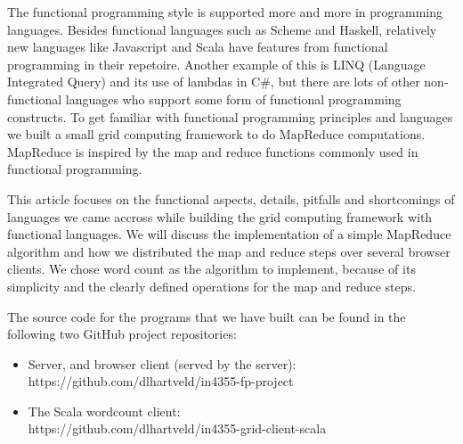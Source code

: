 The functional programming style is supported more and more in programming
languages. Besides functional languages such as Scheme and Haskell, relatively
new languages like Javascript and Scala have features from functional
programming in their repetoire. Another example of this is LINQ (Language
Integrated Query) and its use of lambdas in C\#, but there are lots of other
non-functional languages who support some form of functional programming
constructs. To get familiar with functional programming principles and languages
we built a small grid computing framework to do MapReduce computations.
MapReduce is inspired by the map and reduce functions commonly used in
functional programming.

This article focuses on the functional aspects, details, pitfalls and
shortcomings of languages we came accross while building the grid computing
framework with functional languages. We will discuss the implementation of a
simple MapReduce algorithm and how we distributed the map and reduce steps over
several browser clients. We chose word count as the algorithm to implement,
because of its simplicity and the clearly defined operations for the map and
reduce steps.

The source code for the programs that we have built can be found in the following
two GitHub project repositories:
\begin{itemize}
  \item Server, and browser client (served by the server):\\
  		https://github.com/dlhartveld/in4355-fp-project
  \item The Scala wordcount client:\\
  		https://github.com/dlhartveld/in4355-grid-client-scala
\end{itemize}
